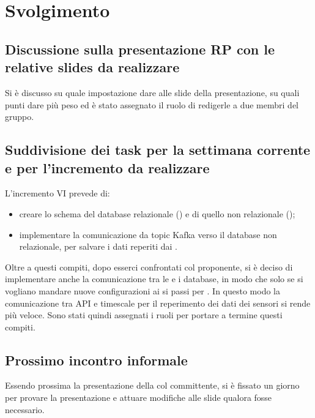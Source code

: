 \newpage
\section*{Svolgimento}

	\subsection*{Discussione sulla presentazione RP con le relative slides da realizzare}
		Si è discusso su quale impostazione dare alle slide della presentazione, su quali punti dare più peso ed è stato assegnato il ruolo di redigerle a due membri del gruppo. 

	\subsection*{Suddivisione dei task per la settimana corrente e per l'incremento da realizzare}
		L'incremento VI prevede di:
			\begin{itemize}
				\item creare lo schema del database relazionale () e di quello non relazionale ();
				\item implementare la comunicazione da topic Kafka verso il database non relazionale, per salvare i dati reperiti dai .
			\end{itemize}
		\newline
		Oltre a questi compiti, dopo esserci confrontati col proponente, si è deciso di implementare anche la comunicazione tra le  e i database, in modo che solo se si vogliano mandare nuove configurazioni ai   si passi per . In questo modo la comunicazione tra API e timescale per il reperimento dei dati dei sensori si rende più veloce.
		\newline
		Sono stati quindi assegnati i ruoli per portare a termine questi compiti.

	\subsection*{Prossimo incontro informale}
		Essendo prossima la presentazione della  col committente, si è fissato un giorno per provare la presentazione e attuare modifiche alle slide qualora fosse necessario.
